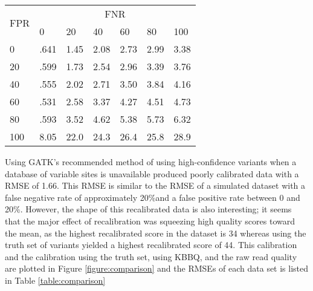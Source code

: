 \begin{table}
\centering
\begin{tabularx}{.5\textwidth}{ l  X  X  X  X  X  X }
\toprule
\multirow{2}{*}{FPR} & \multicolumn{6}{c}{FNR} \\ \cmidrule(lr){2-7}
    & 0    &   20 &   40 &   60 &   80 &   100 \\
\midrule
0   & .641 & 1.45 & 2.08 & 2.73 & 2.99 & 3.38 \\
20  & .599 & 1.73 & 2.54 & 2.96 & 3.39 & 3.76 \\
40  & .555 & 2.02 & 2.71 & 3.50 & 3.84 & 4.16 \\
60  & .531 & 2.58 & 3.37 & 4.27 & 4.51 & 4.73 \\
80  & .593 & 3.52 & 4.62 & 5.38 & 5.73 & 6.32 \\
100 & 8.05 & 22.0 & 24.3 & 26.4 & 25.8 & 28.9 \\
\bottomrule
\end{tabularx}
\label{table:fnrfpr}
\end{table}

Using GATK's recommended method of using high-confidence variants when a database of variable sites is unavailable produced poorly calibrated data with a RMSE of 1.66. This RMSE is similar to the RMSE of a simulated dataset with a false negative rate of approximately 20\%and a false positive rate between 0 and 20\%. However, the shape of this recalibrated data is also interesting; it seems that the major effect of recalibration was squeezing high quality scores toward the mean, as the highest recalibrated score in the dataset is 34 whereas using the truth set of variants yielded a highest recalibrated score of 44. This calibration and the calibration using the truth set, using KBBQ, and the raw read quality are plotted in Figure \ref{figure:comparison} and the RMSEs of each data set is listed in Table \ref{table:comparison}

